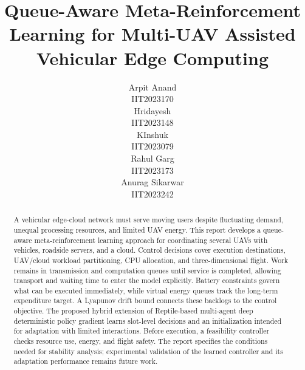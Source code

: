 \documentclass[journal]{IEEEtran}
\begin{document}
\title{Queue-Aware Meta-Reinforcement Learning for Multi-UAV Assisted Vehicular Edge Computing}

\author{
\begin{tabular}[t]{c}Arpit Anand\\IIT2023170\end{tabular} \quad
\begin{tabular}[t]{c}Hridayesh\\IIT2023148\end{tabular} \quad
\begin{tabular}[t]{c}KInshuk\\IIT2023079\end{tabular} \quad
\begin{tabular}[t]{c}Rahul Garg\\IIT2023173\end{tabular} \quad
\begin{tabular}[t]{c}Anurag Sikarwar\\IIT2023242\end{tabular}
}



\maketitle

\begin{abstract}
A vehicular edge-cloud network must serve moving users despite fluctuating demand, unequal processing resources, and limited UAV energy. This report develops a queue-aware meta-reinforcement learning approach for coordinating several UAVs with vehicles, roadside servers, and a cloud. Control decisions cover execution destinations, UAV/cloud workload partitioning, CPU allocation, and three-dimensional flight. Work remains in transmission and computation queues until service is completed, allowing transport and waiting time to enter the model explicitly. Battery constraints govern what can be executed immediately, while virtual energy queues track the long-term expenditure target. A Lyapunov drift bound connects these backlogs to the control objective. The proposed hybrid extension of Reptile-based multi-agent deep deterministic policy gradient learns slot-level decisions and an initialization intended for adaptation with limited interactions. Before execution, a feasibility controller checks resource use, energy, and flight safety. The report specifies the conditions needed for stability analysis; experimental validation of the learned controller and its adaptation performance remains future work.
\end{abstract}
\end{document}

